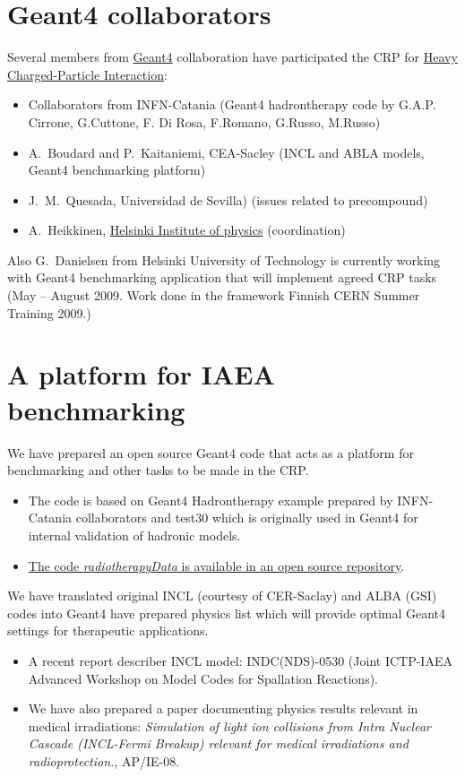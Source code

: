 \documentclass[twoside,floatfix,a4wide]{d}
\numberwithin{equation}{section} %
\begin{document}
\section{Geant4 collaborators}
\vspace{-0.4cm}
Several members from \href{http://geant4.cern.ch}{Geant4} collaboration
have participated the CRP for
\href{http://www-nds.iaea.org/charpar/charpar.htmlx}{Heavy Charged-Particle Interaction}:
\begin{itemize}
\item Collaborators from INFN-Catania 
(Geant4 hadrontherapy code by G.A.P. Cirrone, G.Cuttone, F. Di Rosa, F.Romano, G.Russo, M.Russo)
\item A.~Boudard and P.~Kaitaniemi, CEA-Sacley (INCL and ABLA models, Geant4 benchmarking platform) 
\item J.~M.~Quesada, Universidad de Sevilla) (issues related to precompound)
\item A.~Heikkinen, \href{http://www.hip.fi}{Helsinki Institute of physics} (coordination)
\end{itemize}

Also G.~Danielsen from Helsinki University of Technology is currently working with 
Geant4 benchmarking application that will implement agreed CRP tasks
(May -- August 2009. Work done in the framework Finnish CERN Summer Training 2009.)


\section{A platform for IAEA benchmarking}
\vspace{-0.4cm}
We have prepared an open source Geant4 code that acts as a 
platform for benchmarking and other tasks to be made in the CRP.
\begin{itemize}
\item The code is based on Geant4 Hadrontherapy example prepared by INFN-Catania collaborators
and test30 which is originally used in Geant4 for internal validation of hadronic models.

\item \href{http://github.com/kaitanie/hadrontherapy/}{The code 
{\em radiotherapyData} is available in an open source repository}.
\end{itemize}

We have translated original INCL (courtesy of CER-Saclay) and ALBA (GSI) codes into
Geant4 have prepared physics list which will provide optimal Geant4 settings for therapeutic applications. 
\begin{itemize}
\item  A recent report describer INCL model: INDC(NDS)-0530 
(Joint ICTP-IAEA Advanced Workshop on Model Codes for Spallation Reactions).
\item We have also prepared a paper 
documenting physics results relevant in medical irradiations: 
{\em Simulation of light ion collisions from Intra Nuclear Cascade
(INCL-Fermi Breakup) relevant for medical irradiations and
radioprotection.}, AP/IE-08.
\end{itemize}
\end{document}
